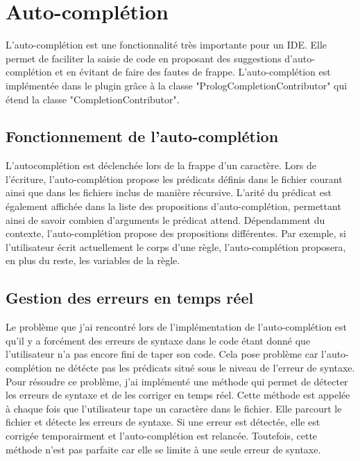 

\section{Auto-complétion}
\noindent L'auto-complétion est une fonctionnalité très importante pour un IDE. Elle permet de faciliter la saisie de code en proposant des suggestions d'auto-complétion et en évitant de faire des fautes de frappe.
\newdoubleline L'auto-complétion est implémentée dans le plugin grâce à la classe "PrologCompletionContributor" qui étend la classe "CompletionContributor".

\subsection{Fonctionnement de l'auto-complétion}
\noindent L'autocomplétion est déclenchée lors de la frappe d'un caractère. Lors de l'écriture, l'auto-complétion propose les prédicats définis dans le fichier courant ainsi que dans les fichiers inclus de manière récursive.
L'arité du prédicat est également affichée dans la liste des propositions d'auto-complétion, permettant ainsi de savoir combien d'arguments le prédicat attend.
\newdoubleline Dépendamment du contexte, l'auto-complétion propose des propositions différentes. Par exemple, si l'utilisateur écrit actuellement le corps d'une règle, l'auto-complétion proposera, en plus du reste, les variables de la règle.

\subsection{Gestion des erreurs en temps réel}
\noindent Le problème que j'ai rencontré lors de l'implémentation de l'auto-complétion est qu'il y a forcément des erreurs
de syntaxe dans le code étant donné que l'utilisateur n'a pas encore fini de taper son code. Cela pose problème car
l'auto-complétion ne détécte pas les prédicats situé sous le niveau de l'erreur de syntaxe.
\newdoubleline Pour résoudre ce problème,
j'ai implémenté une méthode qui permet de détecter les erreurs de syntaxe et de les corriger en temps réel.
Cette méthode est appelée à chaque fois que l'utilisateur tape un caractère dans le fichier. Elle parcourt le fichier et
détecte les erreurs de syntaxe. Si une erreur est détectée, elle est corrigée temporairment et l'auto-complétion est relancée.
\newdoubleline Toutefois, cette méthode n'est pas parfaite car elle se limite à une seule erreur de syntaxe.

